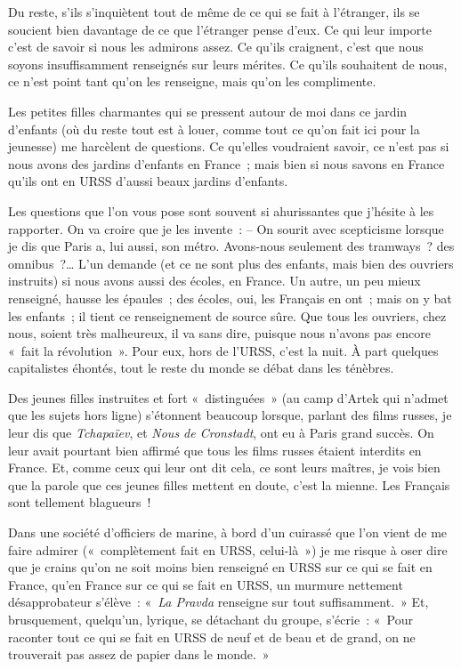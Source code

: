 \documentclass[twoside]{book} %
\newcommand{\astermono}{\medskip\centerline{\color{rubric}\large\selectfont{\syms ✻}}\medskip\par}%
\begin{document}
\astermono

\noindent Du reste, s’ils s’inquiètent tout de même de ce qui se fait à l’étranger, ils se soucient bien davantage de ce que l’étranger pense d’eux. Ce qui leur importe c’est de savoir si nous les admirons assez. Ce qu’ils craignent, c’est que nous soyons insuffisamment renseignés sur leurs mérites. Ce qu’ils souhaitent de nous, ce n’est point tant qu’on les renseigne, mais qu’on les complimente.\par
Les petites filles charmantes qui se pressent autour de moi dans ce jardin d’enfants (où du reste tout est à louer, comme tout ce qu’on fait ici pour la jeunesse) me harcèlent de questions. Ce qu’elles voudraient savoir, ce n’est pas si nous avons des jardins d’enfants en France ; mais bien si nous savons en France qu’ils ont en URSS d’aussi beaux jardins d’enfants.\par
Les questions que l’on vous pose sont souvent si ahurissantes que j’hésite à les rapporter. On va croire que je les invente : – On sourit avec scepticisme lorsque je dis que Paris a, lui aussi, son métro. Avons-nous seulement des tramways ? des omnibus ?… L’un demande (et ce ne sont plus des enfants, mais bien des ouvriers instruits) si nous avons aussi des écoles, en France. Un autre, un peu mieux renseigné, hausse les épaules ; des écoles, oui, les Français en ont ; mais on y bat les enfants ; il tient ce renseignement de source sûre. Que tous les ouvriers, chez nous, soient très malheureux, il va sans dire, puisque nous n’avons pas encore « fait la révolution ». Pour eux, hors de l’URSS, c’est la nuit. À part quelques capitalistes éhontés, tout le reste du monde se débat dans les ténèbres.\par
Des jeunes filles instruites et fort « distinguées » (au camp d’Artek qui n’admet que les sujets hors ligne) s’étonnent beaucoup lorsque, parlant des films russes, je leur dis que \emph{Tchapaïev}, et \emph{Nous de Cronstadt}, ont eu à Paris grand succès. On leur avait pourtant bien affirmé que tous les films russes étaient interdits en France. Et, comme ceux qui leur ont dit cela, ce sont leurs maîtres, je vois bien que la parole que ces jeunes filles mettent en doute, c’est la mienne. Les Français sont tellement blagueurs !\par
Dans une société d’officiers de marine, à bord d’un cuirassé que l’on vient de me faire admirer (« complètement fait en URSS, celui-là ») je me risque à oser dire que je crains qu’on ne soit moins bien renseigné en URSS sur ce qui se fait en France, qu’en France sur ce qui se fait en URSS, un murmure nettement désapprobateur s’élève : « \emph{La Pravda} renseigne sur tout suffisamment. » Et, brusquement, quelqu’un, lyrique, se détachant du groupe, s’écrie : « Pour raconter tout ce qui se fait en URSS de neuf et de beau et de grand, on ne trouverait pas assez de papier dans le monde. »\par
\end{document}

